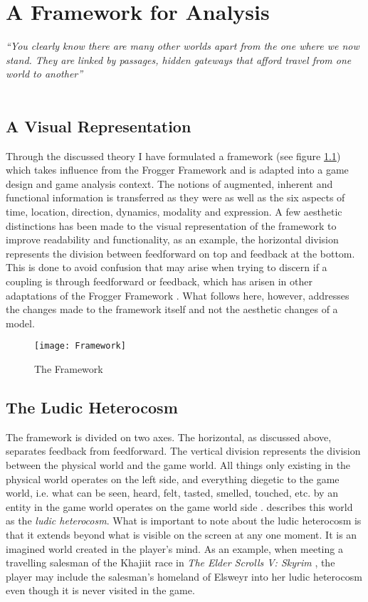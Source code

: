 \chapter{A Framework for Analysis}
\textit{``You clearly know there are many other worlds apart from the one where we now stand. They are linked by passages, hidden gateways that afford travel from one world to another''} \\
 \\

\section{A Visual Representation}
Through the discussed theory I have formulated a framework (see figure \ref{framework}) which takes influence from the Frogger Framework \cite{frogger} and is adapted into a game design and game analysis context. The notions of augmented, inherent and functional information is transferred as they were as well as the six aspects of time, location, direction, dynamics, modality and expression. A few aesthetic distinctions has been made to the visual representation of the framework to improve readability and functionality, as an example, the horizontal division represents the division between feedforward on top and feedback at the bottom. This is done to avoid confusion that may arise when trying to discern if a coupling is through feedforward or feedback, which has arisen in other adaptations of the Frogger Framework \cite{tangifrog}. What follows here, however, addresses the changes made to the framework itself and not the aesthetic changes of a model.

\begin{figure}
  \texttt{[image: Framework]}
  \caption{The Framework}
  \label{framework}
\end{figure}

\section{The Ludic Heterocosm}
The framework is divided on two axes. The horizontal, as discussed above, separates feedback from feedforward. The vertical division represents the division between the physical world and the game world. All things only existing in the physical world operates on the left side, and everything diegetic to the game world, i.e. what can be seen, heard, felt, tasted, smelled, touched, etc. by an entity in the game world operates on the game world side \cite{bordwell}.  describes this world as the \textit{ludic heterocosm}. What is important to note about the ludic heterocosm is that it extends beyond what is visible on the screen at any one moment. It is an imagined world created in the player's mind. As an example, when meeting a travelling salesman of the Khajiit race in \textit{The Elder Scrolls V: Skyrim} \cite{skyrim}, the player may include the salesman's homeland of Elsweyr into her ludic heterocosm even though it is never visited in the game.

